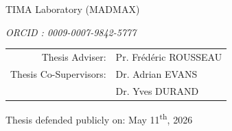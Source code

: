 \begin{titlepage}
\begin{minipage}[t][0.18\headerheight]{\linewidth}
    TIMA Laboratory (MADMAX)
    
    \textit{ORCID : 0009-0007-9842-5777}

\end{minipage}

\begin{minipage}[t][0.04\headerheight]{\linewidth}
    \normalsize
    \centering

    \textsc{\doctype}

\end{minipage}

\begin{minipage}[t][0.12\headerheight]{\linewidth}
    \normalsize
    \centering

    \begin{minipage}{14cm}
        \centering
    \end{minipage}

\end{minipage}

\begin{minipage}[t][0.12\headerheight]{\linewidth}
    \centering


\end{minipage}

\begin{minipage}[t][0.10\headerheight]{\linewidth}
    \normalsize
    \centering

    \begin{tabular}{rl}
        Thesis Adviser: & Pr. Fr\'ed\'eric ROUSSEAU \\
        Thesis Co-Supervisors: & Dr. Adrian EVANS \\
        & Dr. Yves DURAND
    \end{tabular}

\end{minipage}

\begin{minipage}[t][0.03\headerheight]{\linewidth}
    \normalsize
    \centering

    Thesis defended publicly on: May 11\textsuperscript{th}, 2026

\end{minipage}


\end{titlepage}
